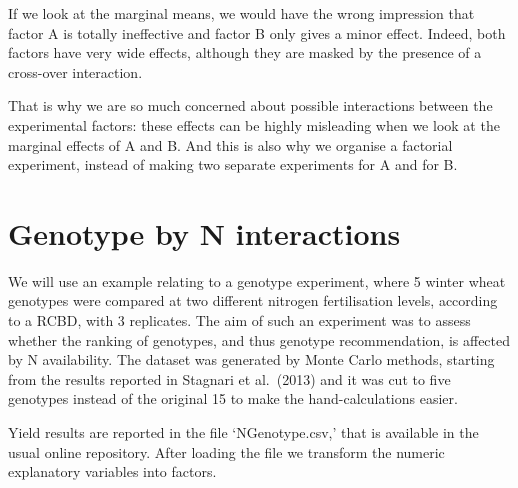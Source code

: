 \documentclass[a4paper,12pt,oneside]{book}
\begin{document}
If we look at the marginal means, we would have the wrong impression that factor A is totally ineffective and factor B only gives a minor effect. Indeed, both factors have very wide effects, although they are masked by the presence of a cross-over interaction.

That is why we are so much concerned about possible interactions between the experimental factors: these effects can be highly misleading when we look at the marginal effects of A and B. And this is also why we organise a factorial experiment, instead of making two separate experiments for A and for B.

\hypertarget{genotype-by-n-interactions}{%
\section{Genotype by N interactions}\label{genotype-by-n-interactions}}

We will use an example relating to a genotype experiment, where 5 winter wheat genotypes were compared at two different nitrogen fertilisation levels, according to a RCBD, with 3 replicates. The aim of such an experiment was to assess whether the ranking of genotypes, and thus genotype recommendation, is affected by N availability. The dataset was generated by Monte Carlo methods, starting from the results reported in Stagnari et al.~(2013) and it was cut to five genotypes instead of the original 15 to make the hand-calculations easier.

Yield results are reported in the file `NGenotype.csv,' that is available in the usual online repository. After loading the file we transform the numeric explanatory variables into factors.

\vspace{12pt}
\end{document}
